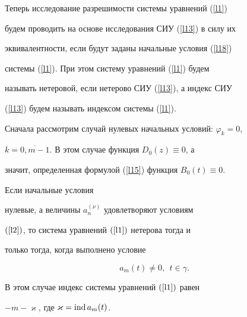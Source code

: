 Теперь исследование разрешимости системы уравнений (\ref{l1})


будем проводить на основе исследования СИУ (\ref{l13}) в силу их


эквивалентности, если будут заданы начальные условия (\ref{l18})


системы (\ref{l1}). При этом систему уравнений (\ref{l1}) будем


называть нетеровой, если нетерово СИУ (\ref{l13}), а индекс СИУ


(\ref{l13}) будем называть индексом системы (\ref{l1}).





Сначала рассмотрим случай нулевых начальных условий: $\varphi_k=0$,


$k=\overline{0,m-1}$. В этом случае функция $D_0(z)\equiv0$, а


значит, определенная формулой (\ref{l15}) функция $B_0(t)\equiv0$.








\begin{thm}


Если начальные условия


нулевые, а величины $a_n^{(\nu)}$ удовлетворяют условиям


$(\ref{l2})$, то система уравнений $(\ref{l1})$ нетерова тогда и


только тогда, когда выполнено условие


\begin{equation}


\label{l19}


a_m(t)\ne0,\ \ t\in\gamma.


\end{equation}


В этом случае индекс системы уравнений $(\ref{l1})$ равен


$-m-\varkappa$, где $\varkappa = \operatorname{ind} a_m(t)$.


\end{thm}









